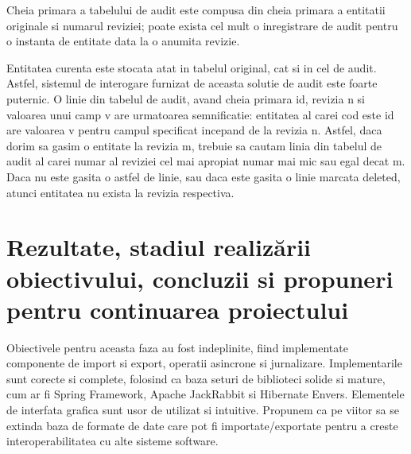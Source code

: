 \documentclass[a4paper, 10pt]{article}
\begin{document}
{\bigskip

Cheia primara a tabelului de audit este compusa din cheia primara a entitatii originale si numarul reviziei; poate exista cel mult o inregistrare de audit pentru o instanta de entitate data la o anumita revizie.

Entitatea curenta este stocata atat in tabelul original, cat si in cel de audit. Astfel, sistemul de interogare furnizat de aceasta solutie de audit este foarte puternic. O linie din tabelul de audit, avand cheia primara id, revizia n si valoarea unui camp v are urmatoarea semnificatie: entitatea al carei cod este id are valoarea v pentru campul specificat incepand de la revizia n. Astfel, daca dorim sa gasim o entitate la revizia m, trebuie sa cautam linia din tabelul de audit al carei numar al reviziei cel mai apropiat numar mai mic sau egal decat m. Daca nu este gasita o astfel de linie, sau daca este gasita o linie marcata deleted, atunci entitatea nu exista la revizia respectiva.

\medskip

\clearpage

\section{Rezultate, stadiul realiz\u{a}rii obiectivului, concluzii si propuneri pentru continuarea proiectului}


\medskip

Obiectivele pentru aceasta faza au fost indeplinite, fiind implementate componente de import si export, operatii asincrone si jurnalizare. 
Implementarile sunt corecte si complete, folosind ca baza seturi de biblioteci solide si mature, cum ar fi Spring Framework, Apache JackRabbit si Hibernate Envers. 
Elementele de interfata grafica sunt usor de utilizat si intuitive. 
Propunem ca pe viitor sa se extinda baza de formate de date care pot fi importate/exportate pentru a creste interoperabilitatea cu alte sisteme software.


\bigskip

\bigskip

\bigskip

\bigskip

\bigskip

\bigskip

\bigskip

\bigskip

}
\end{document}
